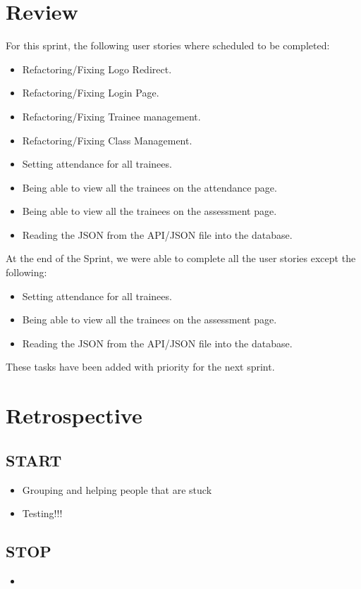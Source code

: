 \documentclass[]{report}
\begin{document}
		\section*{Review}
			For this sprint, the following user stories where scheduled to be completed:
			\begin{itemize}
				\item Refactoring/Fixing Logo Redirect.
				\item Refactoring/Fixing Login Page.
				\item Refactoring/Fixing Trainee management.
				\item Refactoring/Fixing Class Management.
				\item Setting attendance for all trainees.
				\item Being able to view all the trainees on the attendance page.
				\item Being able to view all the trainees on the assessment page.
				\item Reading the JSON from the API/JSON file into the database.
			\end{itemize}
			At the end of the Sprint, we were able to complete all the user stories except the following:
			\begin{itemize}
				\item Setting attendance for all trainees.
				\item Being able to view all the trainees on the assessment page.
				\item Reading the JSON from the API/JSON file into the database.
			\end{itemize}
			These tasks have been added with priority for the next sprint.
		\section*{Retrospective}
			\subsection*{START}
				\begin{itemize}
					\item Grouping and helping people that are stuck
					\item Testing!!!
				\end{itemize}
			\subsection*{STOP}
				\begin{itemize}
					\item 
				\end{itemize}
\end{document}
